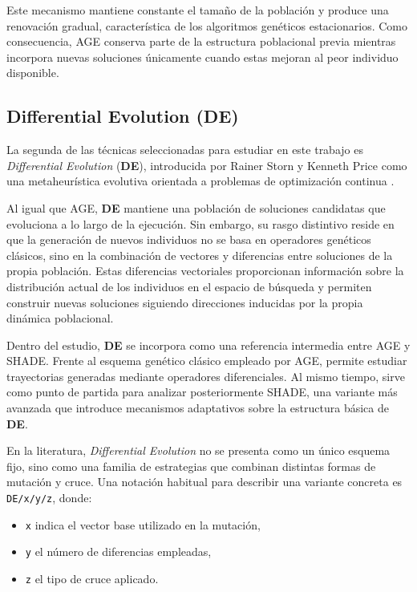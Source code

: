 Este mecanismo mantiene constante el tamaño de la población y produce una renovación gradual, característica de los algoritmos genéticos estacionarios. Como consecuencia, AGE conserva parte de la estructura poblacional previa mientras incorpora nuevas soluciones únicamente cuando estas mejoran al peor individuo disponible.

\subsection{Differential Evolution (DE)}

La segunda de las técnicas seleccionadas para estudiar en este trabajo es
\textit{Differential Evolution} (\textbf{DE}), introducida por Rainer Storn y
Kenneth Price como una metaheurística evolutiva orientada a problemas de
optimización continua \cite{storn1997de}.

Al igual que AGE, \textbf{DE} mantiene una población de soluciones candidatas que evoluciona a lo largo de la ejecución. Sin embargo, su rasgo distintivo reside en que la generación de nuevos individuos no se basa en operadores genéticos clásicos, sino en la combinación de vectores y diferencias entre soluciones de la propia población. Estas diferencias vectoriales proporcionan información sobre la distribución actual de los individuos en el espacio de búsqueda y permiten construir nuevas soluciones siguiendo direcciones inducidas por la propia dinámica poblacional.

Dentro del estudio, \textbf{DE} se incorpora como una referencia intermedia entre AGE y SHADE. Frente al esquema genético clásico empleado por AGE, permite estudiar trayectorias generadas mediante operadores diferenciales. Al mismo tiempo, sirve como punto de partida para analizar posteriormente SHADE, una variante más avanzada que introduce mecanismos adaptativos sobre la estructura básica de \textbf{DE}.

En la literatura, \textit{Differential Evolution} no se presenta como un único esquema fijo, sino como una familia de estrategias que combinan distintas formas de mutación y cruce. Una notación habitual para describir una variante concreta es \texttt{DE/x/y/z}, donde:

\begin{itemize}
    \item \texttt{x} indica el vector base utilizado en la mutación,
    \item \texttt{y} el número de diferencias empleadas,
    \item \texttt{z} el tipo de cruce aplicado.
\end{itemize}

